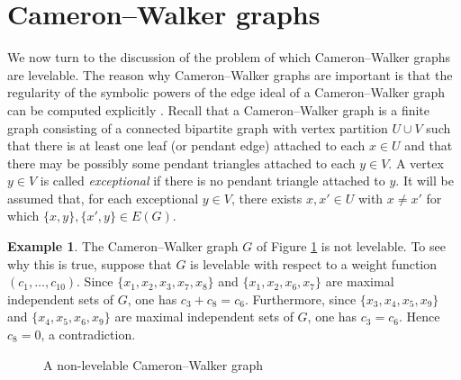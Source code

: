 \documentclass[12pt]{amsart}
\numberwithin{equation}{section}
\theoremstyle{definition}
\newtheorem{example}[theorem]{Example}
\newcounter{i} %
\begin{document}
\section{Cameron--Walker graphs}


We now turn to the discussion of the problem of which Cameron--Walker graphs are levelable.  The reason why Cameron--Walker graphs are important is that the regularity of the 
symbolic powers of the edge ideal of a Cameron--Walker graph can be computed explicitly \cite{S}. Recall that a Cameron--Walker graph \cite{CW2005,HHKO} is a finite graph consisting of a connected bipartite graph with vertex partition $U \cup V$ such that there is at least one leaf (or pendant edge) attached to each $x \in U$ and that there may be possibly some pendant triangles attached to each $y \in V$.  A vertex $y \in V$ is called {\it exceptional} if there is no pendant triangle attached to $y$.  It will be assumed that, for each exceptional $y \in V$, there exists $x, x' \in U$ with $x \neq x'$ for which $\{x,y\}, \{x',y\} \in E(G)$. 

\begin{example}
The Cameron--Walker graph $G$ of Figure \ref{fig:CW} is not levelable.  To see why this is true, suppose that $G$ is levelable with respect to a weight function $(c_1, \ldots, c_{10})$.  Since $\{x_1, x_2, x_3, x_7, x_8\}$ and $\{x_1, x_2, x_6, x_7\}$ are maximal independent sets of $G$, one has $c_3 + c_8 = c_6$.  Furthermore, since $\{x_3, x_4, x_5, x_9\}$ and $\{x_4, x_5, x_6, x_9\}$ are maximal independent sets of $G$, one has $c_3 = c_6$.  Hence $c_8 = 0$, a contradiction.
\begin{figure}[h]
\centering
{}
\caption{A non-levelable Cameron--Walker graph} \label{fig:CW}
\end{figure} 
\end{example}
\end{document}

